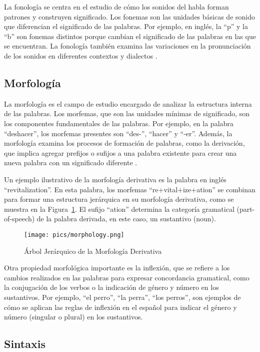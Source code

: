 La fonología se centra en el estudio de cómo los sonidos del habla forman patrones y construyen significado. Los fonemas son las unidades básicas de sonido que diferencian el significado de las palabras. Por ejemplo, en inglés, la ``p'' y la ``b'' son fonemas distintos porque cambian el significado de las palabras en las que se encuentran. La fonología también examina las variaciones en la pronunciación de los sonidos en diferentes contextos y dialectos \cite{fromkin2018introduction}.
\subsection{Morfología}

La morfología es el campo de estudio encargado de analizar la estructura interna de las palabras. Los morfemas, que son las unidades mínimas de significado, son los componentes fundamentales de las palabras. Por ejemplo, en la palabra ``deshacer'', los morfemas presentes son ``des-'', ``hacer'' y ``-er''. Además, la morfología examina los procesos de formación de palabras, como la derivación, que implica agregar prefijos o sufijos a una palabra existente para crear una nueva palabra con un significado diferente \cite{JohnsonMLSS}.

Un ejemplo ilustrativo de la morfología derivativa es la palabra en inglés ``revitalization''. En esta palabra, los morfemas ``re+vital+ize+ation'' se combinan para formar una estructura jerárquica en su morfología derivativa, como se muestra en la Figura~\ref{fig:morfo_der}. El sufijo ``ation'' determina la categoría gramatical (part-of-speech) de la palabra derivada, en este caso, un sustantivo (noun).

\begin{figure}[h]
	\centering
	\texttt{[image: pics/morphology.png]}
	\caption{Árbol Jerárquico de la Morfología Derivativa}
	\label{fig:morfo_der}
\end{figure}

Otra propiedad morfológica importante es la inflexión, que se refiere a los cambios realizados en las palabras para expresar concordancia gramatical, como la conjugación de los verbos o la indicación de género y número en los sustantivos. Por ejemplo, ``el perro'', ``la perra'', ``los perros'', son ejemplos de cómo se aplican las reglas de inflexión en el español para indicar el género y número (singular o plural) en los sustantivos.

\subsection{Sintaxis}

